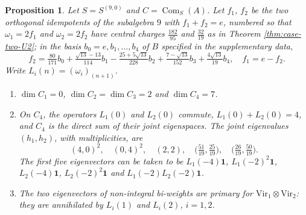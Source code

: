 \documentclass[leqno]{article}
\newcommand{\ot}{\otimes}
\newtheorem{prop}[thm]{Proposition}
\numberwithin{equation}{section}
\begin{document}
\begin{prop}
\label{prop:commutant-biweights}
Let $S = S^{(9,0)}$ and $C = \operatorname{Com}_S(A)$. Let $f_1$, $f_2$ be the two orthogonal idempotents of the subalgebra $9$ with $f_1+f_2 = e$, numbered so that $\omega_1 = 2f_1$ and $\omega_2 = 2f_2$ have central charges $\frac{182}{95}$ and $\frac{32}{19}$ as in Theorem \ref{thm:case-two-U2}; in the basis $b_0 = e, b_1, \ldots, b_4$ of $B$ specified in the supplementary data,
\[
f_2 = \tfrac{80}{171} b_0+\tfrac{\sqrt{13}-13}{114} b_1-\tfrac{25+5\sqrt{13}}{228} b_2+\tfrac{7-\sqrt{13}}{152} b_3+\tfrac{4\sqrt{13}}{19} b_4, \quad f_1 = e-f_2.
\]
Write $L_i(n) = (\omega_i)_{(n+1)}$.
\begin{enumerate}
\item $\dim C_1 = 0$, $\dim C_2 = \dim C_3 = 2$ and $\dim C_4 = 7$.
\item On $C_4$, the operators $L_1(0)$ and $L_2(0)$ commute, $L_1(0)+L_2(0) = 4$, and $C_4$ is the direct sum of their joint eigenspaces. The joint eigenvalues $(h_1,h_2)$, with multiplicities, are
\[
(4,0)^2, \quad (0,4)^2, \quad (2,2), \quad \big(\tfrac{51}{19},\tfrac{25}{19}\big), \quad \big(\tfrac{26}{19},\tfrac{50}{19}\big).
\]
The first five eigenvectors can be taken to be $L_1(-4)\mathbf 1$, $L_1(-2)^2\mathbf 1$, $L_2(-4)\mathbf 1$, $L_2(-2)^2\mathbf 1$ and $L_1(-2)L_2(-2)\mathbf 1$.
\item The two eigenvectors of non-integral bi-weights are primary for $\mathrm{Vir}_1 \ot \mathrm{Vir}_2$: they are annihilated by $L_i(1)$ and $L_i(2)$, $i = 1,2$.
\end{enumerate}
\end{prop}
\end{document}
